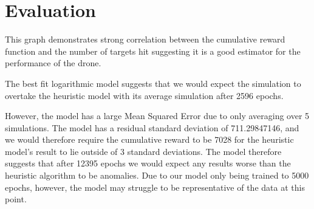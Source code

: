 \section{Evaluation}

This graph demonstrates strong correlation between the cumulative reward function and the number of targets hit suggesting it is a good estimator for the performance of the drone.  

The best fit logarithmic model suggests that we would expect the simulation to overtake the heuristic model with its average simulation after 2596 epochs.  

However, the model has a large Mean Squared Error due to only averaging over 5 simulations.
The model has a residual standard deviation of 711.29847146, and we would therefore require the cumulative reward to be 7028 for the heuristic model's result to lie outside of 3 standard deviations.
The model therefore suggests that after 12395 epochs we would expect any results worse than the heuristic algorithm to be anomalies.
Due to our model only being trained to 5000 epochs, however, the model may struggle to be representative of the data at this point.

